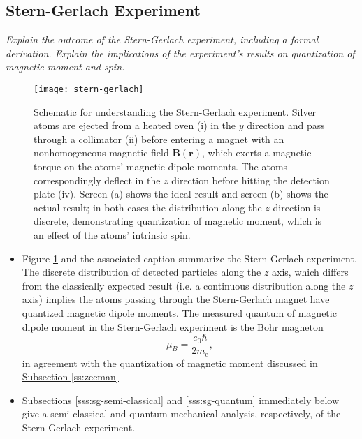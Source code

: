 \documentclass[11pt, a4paper]{article}
\newcommand{\SG}{Stern-Gerlach\xspace}
\renewcommand{\vec}[1]{\bm{#1}}  %
\renewcommand{\r}{\vec{r}}  %
\newcommand{\B}{\vec{B}}  %
\begin{document}
\subsection{Stern-Gerlach Experiment}

\textit{Explain the outcome of the Stern-Gerlach experiment, including a formal derivation. Explain the implications of the experiment's results on quantization of magnetic moment and spin.}

\begin{figure}[htb!]
    \centering
    \texttt{[image: stern-gerlach]}
    \caption{Schematic for understanding the Stern-Gerlach experiment. Silver atoms are ejected from a heated oven (i) in the $ y $ direction and pass through a collimator (ii) before entering a magnet with an nonhomogeneous magnetic field $ \B(\r) $, which exerts a magnetic torque on the atoms' magnetic dipole moments. The atoms correspondingly deflect in the $ z $ direction before hitting the detection plate (iv). Screen (a) shows the ideal result and screen (b) shows the actual result; in both cases the distribution along the $ z $ direction is discrete, demonstrating quantization of magnetic moment, which is an effect of the atoms' intrinsic spin.}
    \label{fig:stern-gerlach}
\end{figure}

\begin{itemize}
    \item Figure \ref{fig:stern-gerlach} and the associated caption summarize the Stern-Gerlach experiment. The discrete distribution of detected particles along the $ z $ axis, which differs from the classically expected result (i.e. a continuous distribution along the $ z $ axis) implies the atoms passing through the \SG magnet have quantized magnetic dipole moments. The measured quantum of magnetic dipole moment in the \SG experiment is the Bohr magneton
    \begin{equation*}
        \mu_{B} = \frac{e_{0}\hbar}{2m_{\text{e}}},
    \end{equation*}
    in agreement with the quantization of magnetic moment discussed in \hyperref[ss:zeeman]{\underline{Subsection \ref{ss:zeeman}}}
    
    \item Subsections \ref{sss:sg-semi-classical} and \ref{sss:sg-quantum} immediately below give a semi-classical and quantum-mechanical analysis, respectively, of the Stern-Gerlach experiment.

\end{itemize}
\end{document}
